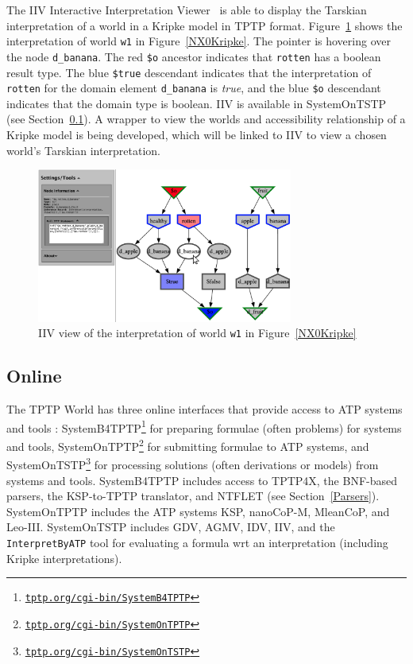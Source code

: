 \documentclass{ceurart}
\begin{document}
The IIV Interactive Interpretation Viewer~\cite{SS+23-LPAR,MS23-Poster} is able to display the
Tarskian interpretation of a world in a Kripke model in TPTP format.
Figure~\ref{NX0InterpretationW1} shows the interpretation of world {\tt w1} in 
Figure~\ref{NX0Kripke}.
The pointer is hovering over the node {\tt d\_banana}.
The red {\tt \$o} ancestor indicates that {\tt rotten} has a boolean result type.
The blue {\tt \$true} descendant indicates that the interpretation of {\tt rotten} for the
domain element {\tt d\_banana} is {\em true}, and the blue {\tt \$o} descendant indicates that the
domain type is boolean.
IIV is available in SystemOnTSTP (see Section~\ref{Online}).
A wrapper to view the worlds and accessibility relationship of a Kripke model is being developed,
which will be linked to IIV to view a chosen world's Tarskian interpretation.

\begin{figure}[htbp]
\centering
\includegraphics[width=0.75\textwidth]{NX0InterpretationW1.pdf}
\caption{IIV view of the interpretation of world {\tt w1} in Figure~\ref{NX0Kripke}}
\label{NX0InterpretationW1}
\end{figure}

\subsection{Online}
\label{Online}

The TPTP World has three online interfaces that provide access to ATP systems and tools
\cite{Sut00-CADE-17,Sut07-CSR}:
SystemB4TPTP\footnote{%
\href{https://tptp.org/cgi-bin/SystemB4TPTP}{\tt tptp.org/cgi-bin/SystemB4TPTP}}
for preparing formulae (often problems) for systems and tools, 
SystemOnTPTP\footnote{%
\href{https://tptp.org/cgi-bin/SystemOnTPTP}{\tt tptp.org/cgi-bin/SystemOnTPTP}}
for submitting formulae to ATP systems, and 
SystemOnTSTP\footnote{%
\href{https://tptp.org/cgi-bin/SystemOnTSTP}{\tt tptp.org/cgi-bin/SystemOnTSTP}}
for processing solutions (often derivations or models) from systems and tools.
SystemB4TPTP includes access to TPTP4X, the BNF-based parsers, the KSP-to-TPTP translator, and 
NTFLET (see Section~\ref{Parsers}).
SystemOnTPTP includes the ATP systems KSP, nanoCoP-M, MleanCoP, and Leo-III.
SystemOnTSTP includes GDV, AGMV, IDV, IIV, and the {\tt InterpretByATP} tool for evaluating a 
formula wrt an interpretation (including Kripke interpretations).
\end{document}
